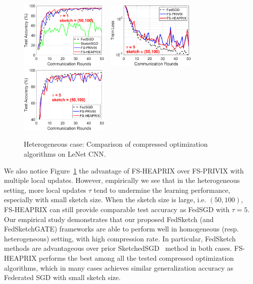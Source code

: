 \documentclass[twoside]{article}
\begin{document}
\begin{figure}[t]
\begin{center}
{		\includegraphics[width=1.7in]{MNIST_figures/local1_sketch50_iid0_test_acc.eps} 
		}
		\mbox{\hspace{-0.15in}	
		\includegraphics[width=1.7in]{MNIST_figures/local5_sketch50_iid0_train_loss.eps}\hspace{-0.12in}
		\includegraphics[width=1.7in]{MNIST_figures/local5_sketch50_iid0_test_acc.eps}
		}
	\end{center}
	\vspace{-0.1in}
	\caption{Heterogeneous case: Comparison of compressed optimization algorithms on LeNet CNN.}
    \label{fig:MNIST-iid0}
\end{figure}

We also notice Figure~\ref{fig:MNIST-iid0} the advantage of FS-HEAPRIX over FS-PRIVIX with multiple local updates. 
However, empirically we see that in the heterogeneous setting, more local updates $\tau$ tend to undermine the learning performance, especially with small sketch size.  
When the sketch size is large, i.e. $(50,100)$, FS-HEAPRIX can still provide comparable test accuracy as FedSGD with $\tau=5$.
Our empirical study demonstrates that our proposed FedSketch (and FedSketchGATE) frameworks are able to perform well in homogeneous (resp. heterogeneous) setting, with high compression rate. 
In particular, FedSketch methods are advantageous over prior SketchedSGD~\cite{ivkin2019communication} method in both cases. 
FS-HEAPRIX performs the best among all the tested compressed optimization algorithms, which in many cases achieves similar generalization accuracy as Federated SGD with small sketch size. 
\end{document}
